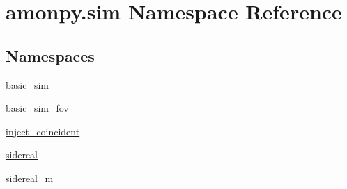 \hypertarget{namespaceamonpy_1_1sim}{\section{amonpy.\-sim Namespace Reference}
\label{namespaceamonpy_1_1sim}
}
\subsection*{Namespaces}
\begin{DoxyCompactItemize}
\item 
\hyperlink{namespaceamonpy_1_1sim_1_1basic__sim}{basic\-\_\-sim}
\item 
\hyperlink{namespaceamonpy_1_1sim_1_1basic__sim__fov}{basic\-\_\-sim\-\_\-fov}
\item 
\hyperlink{namespaceamonpy_1_1sim_1_1inject__coincident}{inject\-\_\-coincident}
\item 
\hyperlink{namespaceamonpy_1_1sim_1_1sidereal}{sidereal}
\item 
\hyperlink{namespaceamonpy_1_1sim_1_1sidereal__m}{sidereal\-\_\-m}
\end{DoxyCompactItemize}
